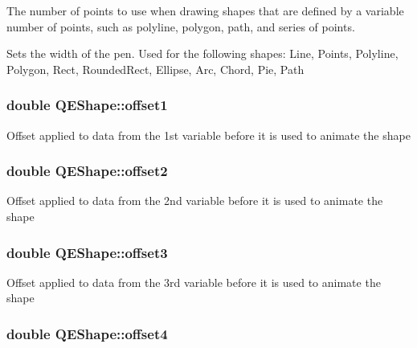 The number of points to use when drawing shapes that are defined by a variable number of points, such as polyline, polygon, path, and series of points.

Sets the width of the pen. Used for the following shapes: Line, Points, Polyline, Polygon, Rect, RoundedRect, Ellipse, Arc, Chord, Pie, Path \hypertarget{classQEShape_a93f9f86f53629c22a050cf40b2119e48}{
\subsubsection[{offset1}]{\setlength{\rightskip}{0pt plus 5cm}double QEShape::offset1}}
\label{classQEShape_a93f9f86f53629c22a050cf40b2119e48}
Offset applied to data from the 1st variable before it is used to animate the shape \hypertarget{classQEShape_a84870198dda8f607681f49983c7581a0}{
\subsubsection[{offset2}]{\setlength{\rightskip}{0pt plus 5cm}double QEShape::offset2}}
\label{classQEShape_a84870198dda8f607681f49983c7581a0}
Offset applied to data from the 2nd variable before it is used to animate the shape \hypertarget{classQEShape_a7c1810b1167f108265fc8191c8d2a6eb}{
\subsubsection[{offset3}]{\setlength{\rightskip}{0pt plus 5cm}double QEShape::offset3}}
\label{classQEShape_a7c1810b1167f108265fc8191c8d2a6eb}
Offset applied to data from the 3rd variable before it is used to animate the shape \hypertarget{classQEShape_ae44e71e3555a29795e8ade5997b8b263}{
\subsubsection[{offset4}]{\setlength{\rightskip}{0pt plus 5cm}double QEShape::offset4}}

